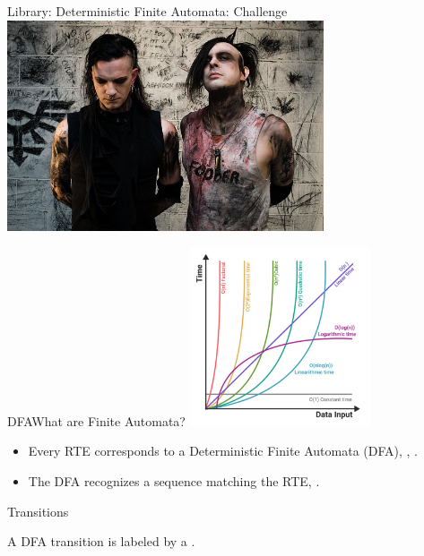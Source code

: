 


{  
\begin{frame}{Library: }{Deterministic Finite Automata: Challenge }
  \centering
  \includegraphics[width=0.7\textwidth]{fa-band.jpg}
\end{frame}
}

\begin{frame}{DFA}{What are Finite Automata?}
  \includegraphics[width=0.4\textwidth]{complexity.png}

  \begin{itemize}
  \item   Every RTE corresponds to a Deterministic Finite Automata (DFA), , .

  \item   The DFA recognizes a sequence matching the RTE, .

  \end{itemize}
\end{frame}

\begin{frame}{ Transitions}

  \scalebox{0.8}{}

  A DFA transition is labeled by a .
\end{frame}



